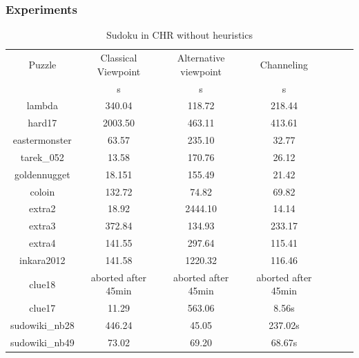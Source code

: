 \documentclass{report}
\begin{document}
\subsubsection{Experiments}
\begin{table}[h!]
  \begin{tabular}{|c|c|c|c|c|c|c|}
    \hline
    \multirow{1}{*}{Puzzle} &
    \multicolumn{1}{L|}{Classical Viewpoint} &
    \multicolumn{1}{L|}{Alternative viewpoint} &
    \multicolumn{1}{L|}{Channeling} \\
    & s & s & s \\
    \hline
        lambda & 340.04 & 118.72 & 218.44 \\
        hard17 & 2003.50 & 463.11 & 413.61 \\
        eastermonster & 63.57 & 235.10 & 32.77 \\
        tarek\_052 & 13.58 & 170.76 & 26.12 \\
        goldennugget & 18.151 & 155.49 & 21.42 \\
        coloin & 132.72 & 74.82 & 69.82 \\
        extra2 & 18.92 & 2444.10 & 14.14 \\
        extra3 & 372.84 & 134.93 & 233.17 \\
        extra4 & 141.55 & 297.64 & 115.41 \\
        inkara2012 & 141.58 & 1220.32 & 116.46 \\
        clue18 & aborted after 45min & aborted after 45min & aborted after 45min \\
        clue17 & 11.29 & 563.06 & 8.56s \\
        sudowiki\_nb28& 446.24 & 45.05 & 237.02s \\
        sudowiki\_nb49 & 73.02 & 69.20 & 68.67s \\
    \hline
  \end{tabular}
  \caption{Sudoku in CHR without heuristics}
\end{table}
\end{document}

